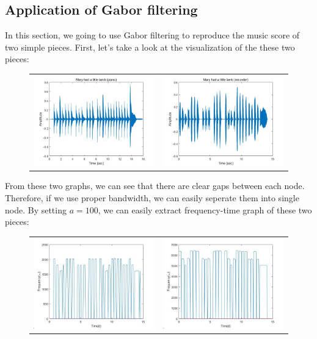 \documentclass[12pt]{article}
\begin{document}
\subsection{Application of Gabor filtering}
In this section, we going to use Gabor filtering to reproduce the music score of two simple pieces. First, let's take a look at the visualization of the these two pieces:
\begin{figure}[H]
\begin{tabular}{cc}
  \includegraphics[width=65mm]{p.jpg} &    \includegraphics[width=65mm]{r.jpg} \\
\end{tabular}
\end{figure}
From these two graphs, we can see that there are clear gaps between each node. Therefore, if we use proper bandwidth, we can easily seperate them into single node. By setting $a=100$, we can easily extract frequency-time graph of these two pieces:
\begin{figure}[H]
\begin{tabular}{cc}
  \includegraphics[width=65mm]{pf.jpg} &    \includegraphics[width=65mm]{rf.jpg} \\
\end{tabular}
\end{figure}
\end{document}
